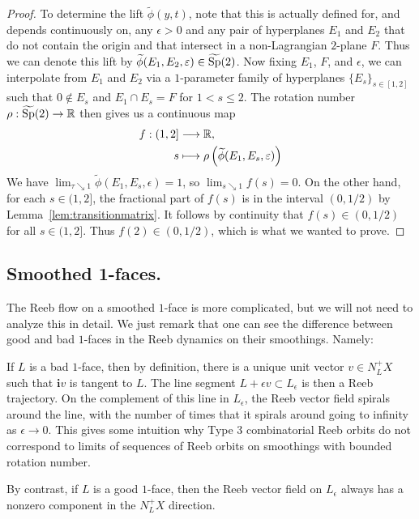 \begin{proof}
To determine the lift $\widetilde{\phi}(y,t)$, note that this is actually defined for, and depends continuously on, any $\epsilon>0$ and any pair of hyperplanes $E_1$ and $E_2$ that do not contain the origin and that intersect in a non-Lagrangian $2$-plane $F$. Thus we can denote this lift by $\widetilde{\phi}(E_1,E_2,\varepsilon)\in\widetilde{\operatorname{Sp}}(2)$.
Now fixing $E_1$, $F$, and $\epsilon$, we can interpolate from $E_1$ and $E_2$ via a $1$-parameter family of hyperplanes $\{E_s\}_{s\in[1,2]}$ such that $0\notin E_s$ and $E_1\cap E_s=F$ for $1<s\le 2$. The rotation number $\rho:\widetilde{\operatorname{Sp}}(2)\to{\mathbb R}$ then gives us a continuous map
\[
\begin{split}
f: (1,2] &\longrightarrow {\mathbb R},\\
s &\longmapsto \rho\left(\widetilde{\phi}(E_1,E_s,\varepsilon)\right)
\end{split}
\]
We have $\lim_{\tau\searrow 1}\widetilde{\phi}(E_1,E_s,\epsilon)=1$, so $\lim_{s\searrow 1}f(s) = 0$. On the other hand, for each $s\in(1,2]$, the fractional part of $f(s)$ is in the interval $(0,1/2)$ by Lemma~\ref{lem:transitionmatrix}. It follows by continuity that $f(s)\in(0,1/2)$ for all $s\in(1,2]$. Thus $f(2)\in(0,1/2)$, which is what we wanted to prove.
\end{proof}

\subsection*{Smoothed 1-faces.} The Reeb flow on a smoothed $1$-face is more complicated, but we will not need to analyze this in detail. We just remark that one can see the difference between good and bad $1$-faces in the Reeb dynamics on their smoothings. Namely:

\begin{remark}
\label{rem:spiral}
If $L$ is a bad $1$-face, then by definition, there is a unique unit vector $v\in N_L^+X$ such that ${\mathbf i}v$ is tangent to $L$. The line segment $L+\epsilon v\subset L_\epsilon$ is then a Reeb trajectory. On the complement of this line in $L_\epsilon$, the Reeb vector field spirals around the line, with the number of times that it spirals around going to infinity as $\epsilon\to 0$. This gives some intuition why Type 3 combinatorial Reeb orbits do not correspond to limits of sequences of Reeb orbits on smoothings with bounded rotation number.
\end{remark}

By contrast, if $L$ is a good $1$-face, then the Reeb vector field on $L_\epsilon$ always has a nonzero component in the $N_L^+X$ direction.

